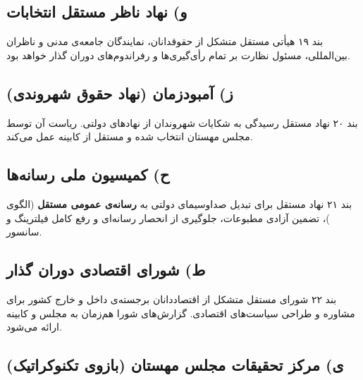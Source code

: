 \documentclass[12pt,a4paper,twoside,openany]{book}
\begin{document}
	\subsection{و) نهاد ناظر مستقل انتخابات}
	
	\begin{bandbox}{بند ۱۹}
		هیأتی مستقل متشکل از حقوقدانان، نمایندگان جامعه‌ی مدنی و ناظران بین‌المللی،
		مسئول نظارت بر تمام رأی‌گیری‌ها و رفراندوم‌های دوران گذار خواهد بود.
	\end{bandbox}
	
	\subsection{ز) آمبودزمان (نهاد حقوق شهروندی)}
	
	\begin{bandbox}{بند ۲۰}
		نهاد مستقل رسیدگی به شکایات شهروندان از نهادهای دولتی. ریاست آن توسط مجلس مهستان
		انتخاب شده و مستقل از کابینه عمل می‌کند.
	\end{bandbox}
	
	\subsection{ح) کمیسیون ملی رسانه‌ها}
	
	\begin{bandbox}{بند ۲۱}
		نهاد مستقل برای تبدیل صداوسیمای دولتی به \textbf{رسانه‌ی عمومی مستقل} (الگوی
		)، تضمین آزادی مطبوعات، جلوگیری از انحصار رسانه‌ای و رفع کامل
		فیلترینگ و سانسور.
	\end{bandbox}
	
	\subsection{ط) شورای اقتصادی دوران گذار}
	
	\begin{bandbox}{بند ۲۲}
		شورای مستقل متشکل از اقتصاددانان برجسته‌ی داخل و خارج کشور برای مشاوره و طراحی
		سیاست‌های اقتصادی. گزارش‌های شورا هم‌زمان به مجلس و کابینه ارائه می‌شود.
	\end{bandbox}
	
	\subsection{ی) مرکز تحقیقات مجلس مهستان (بازوی تکنوکراتیک)}
	
\end{document}

